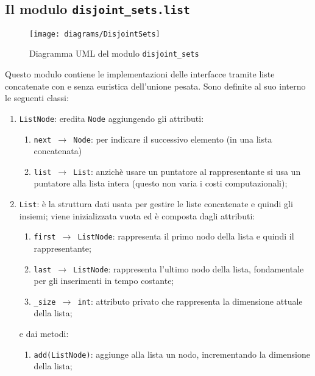 \subsection{Il modulo \texttt{disjoint\_sets.list}}

\begin{figure}[!b]
      \centering
      \texttt{[image: diagrams/DisjointSets]}
      \caption{Diagramma UML del modulo \texttt{disjoint\_sets}}
\end{figure}

Questo modulo contiene le implementazioni delle interfacce tramite liste concatenate con
e senza euristica dell'unione pesata. Sono definite al suo interno le seguenti classi:

\begin{enumerate}
      \item \texttt{ListNode}: eredita \texttt{Node} aggiungendo gli attributi:
            \begin{enumerate}
                  \item \texttt{next $\rightarrow$ Node}: per indicare il successivo elemento (in una lista concatenata)
                  \item \texttt{list $\rightarrow$ List}: anzichè usare un puntatore al rappresentante si usa un puntatore alla lista
                        intera (questo non varia i costi computazionali);
            \end{enumerate}
            \newpage
      \item \texttt{List}: è la struttura dati usata per gestire le liste concatenate e quindi gli insiemi;
            viene inizializzata vuota ed è composta dagli attributi:
            \begin{enumerate}
                  \item \texttt{first $\rightarrow$ ListNode}: rappresenta il primo nodo della lista e quindi il rappresentante;
                  \item \texttt{last $\rightarrow$ ListNode}: rappresenta l'ultimo nodo della lista, fondamentale per gli inserimenti
                        in tempo costante;
                  \item \texttt{\_size $\rightarrow$ int}: attributo privato che rappresenta la dimensione attuale della lista;
            \end{enumerate}
            e dai metodi:
            \begin{enumerate}[resume]
                  \item \texttt{add(ListNode)}: aggiunge alla lista un nodo, incrementando la dimensione della lista;

\end{enumerate}
\end{enumerate}

